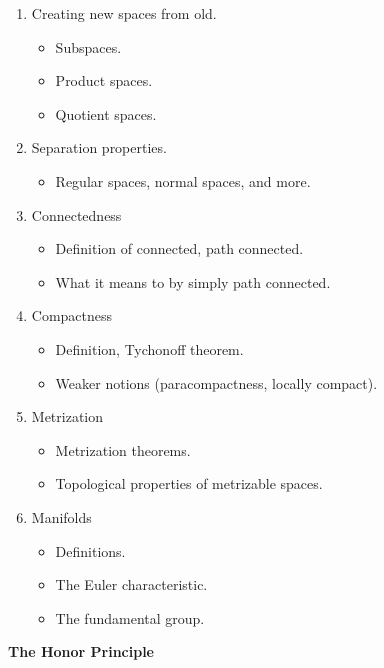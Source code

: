 \documentclass{article}
\begin{document}
\begin{enumerate}
\begin{itemize}
            \end{itemize}
        \item Creating new spaces from old.
            \begin{itemize}
                \item Subspaces.
                \item Product spaces.
                \item Quotient spaces.
            \end{itemize}
        \item Separation properties.
            \begin{itemize}
                \item Regular spaces, normal spaces, and more.
            \end{itemize}
        \item Connectedness
            \begin{itemize}
                \item Definition of connected, path connected.
                \item What it means to by simply path connected.
            \end{itemize}
        \item Compactness
            \begin{itemize}
                \item Definition, Tychonoff theorem.
                \item Weaker notions (paracompactness, locally compact).
            \end{itemize}
        \item Metrization
            \begin{itemize}
                \item Metrization theorems.
                \item Topological properties of metrizable spaces.
            \end{itemize}
        \item Manifolds
            \begin{itemize}
                \item Definitions.
                \item The Euler characteristic.
                \item The fundamental group.
            \end{itemize}
    \end{enumerate}
    \textbf{The Honor Principle}
    \par\hfill\par
\end{document}
